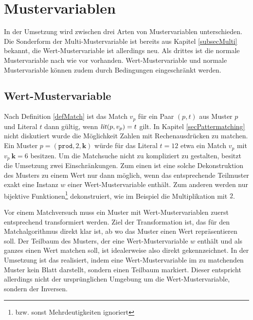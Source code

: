\section{Mustervariablen} \label{subsecMustervariablen}
In der Umsetzung wird zwischen drei Arten von Mustervariablen unterschieden. Die Sonderform der Multi-Mustervariable ist bereits aus Kapitel \ref{subsecMulti} bekannt, die Wert-Mustervariable ist allerdings neu. Als drittes ist die normale Mustervariable nach wie vor vorhanden. Wert-Mustervariable und normale Mustervariable können zudem durch Bedingungen eingeschränkt werden.

\subsection{Wert-Mustervariable} \label{subsubsecWertMustervariable}
Nach Definition \ref{defMatch} ist das Match $v_p$ für ein Paar $(p, t)$ aus Muster $p$ und Literal $t$ dann gültig, wenn $\mathit{lit}(p, v_p) = t$ gilt. In Kapitel \ref{secPattermatching} nicht diskutiert wurde die Möglichkeit Zahlen mit Rechenausdrücken zu matchen. Ein Muster $p = (\texttt{prod}, 2, \mathbf k)$ würde für das Literal $t = 12$ etwa ein Match $v_p$ mit $v_p~\mathbf k = 6$ besitzen. Um die Matchsuche nicht zu kompliziert zu gestalten, besitzt die Umsetzung zwei Einschränkungen. Zum einen ist eine solche Dekonstruktion des Musters zu einem Wert nur dann möglich, wenn das entsprechende Teilmuster exakt eine Instanz $w$ einer Wert-Mustervariable enthält. Zum anderen werden nur bijektive Funktionen\footnote{bzw. sonst Mehrdeutigkeiten ignoriert} dekonstruiert, wie im Beispiel die Multiplikation mit $2$. 


Vor einem Matchversuch muss ein Muster mit Wert-Mustervariablen zuerst entsprechend transformiert werden. Ziel der Transformation ist, das für den Matchalgorithmus direkt klar ist, ab wo das Muster einen Wert repräsentieren soll. Der Teilbaum des Musters, der eine Wert-Mustervariable $w$ enthält und als ganzes einen Wert matchen soll, ist idealerweise also direkt gekennzeichnet. In der Umsetzung ist das realisiert, indem eine Wert-Mustervariable im zu matchenden Muster kein Blatt darstellt, sondern einen Teilbaum markiert. Dieser entspricht allerdings nicht der ursprünglichen Umgebung um die Wert-Mustervariable, sondern der Inversen. 

